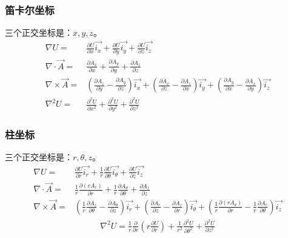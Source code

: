 \subsubsection{笛卡尔坐标}
三个正交坐标是：$x, y, z$。
\begin{subequations}\label{eqn:field cart}
	\begin{align}
\nabla U=&\frac{\partial U}{\partial x}\vec{i_x} +\frac{\partial U}{\partial y}\vec{i_y}+\frac{\partial U}{\partial z}\vec{i_z}  \\
\nabla\cdot \vec{A}=& \frac{\partial{A_x}}{\partial x} +\frac{\partial{A_y}}{\partial y}+\frac{\partial{A_z}}{\partial z}\\
\nabla\times \vec{A}=& \left(\frac{\partial{A_z}}{\partial y} -\frac{\partial{A_y}}{\partial z}\right)\vec{i_x} + \left(\frac{\partial{A_x}}{\partial z} -\frac{\partial{A_z}}{\partial x}\right) \vec{i_y}
+ \left(\frac{\partial{A_y}}{\partial x} -\frac{\partial{A_x}}{\partial y}\right)\vec{i_z} \\
\nabla^2 U=&\frac{\partial^2 U}{\partial x^2}+\frac{\partial^2 U}{\partial y^2}+\frac{\partial^2 U}{\partial z^2}
  	\end{align}
\end{subequations}

\subsubsection{柱坐标}
三个正交坐标是：$r, \theta, z$。
\begin{subequations}\label{eqn:field cyl}
	\begin{align}
\nabla U=&\frac{\partial U}{\partial r}\vec{i_r} +\frac{1}{r}\frac{\partial U}{\partial \theta}\vec{i_{\theta}}+\frac{\partial U}{\partial z}\vec{i_z} \\
\nabla\cdot \vec{A} =& \frac{1}{r}\frac{\partial{(r A_r)}}{\partial r} +\frac{1}{r}\frac{\partial{A_\theta}}{\partial \theta}+\frac{\partial{A_z}}{\partial z} \\
\nabla\times \vec{A}=& \left(\frac{1}{r}\frac{\partial{A_z}}{\partial \theta} -\frac{\partial{A_\theta}}{\partial z}\right)\vec{i_r} + \left(\frac{\partial{A_r}}{\partial z} -\frac{\partial{A_z}}{\partial r}\right) \vec{i_\theta}+ \left(\frac{1}{r}\frac{\partial{(r A_\theta)}}{\partial r} -\frac{1}{r}\frac{\partial{A_r}}{\partial \theta}\right)\vec{i_z}
  	\end{align}
\end{subequations}
\begin{align*}
\nabla^2 U=\frac{1}{r}\frac{\partial}{\partial r}\left(r\frac{\partial U}{\partial r}\right)+\frac{1}{r^2}\frac{\partial^2 U}{\partial \theta^2}+\frac{\partial^2 U}{\partial z^2}\tag{2.29}
\end{align*}
